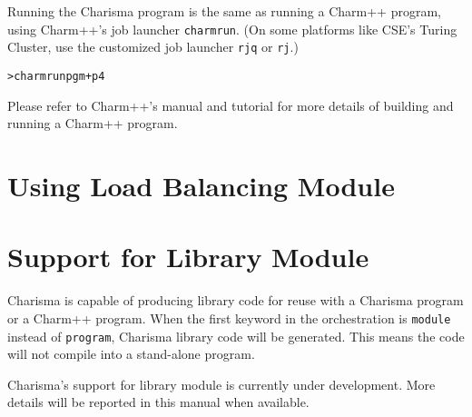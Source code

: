 \documentclass[10pt]{article}
\def\code#1{{\small {\tt {#1}}}}
\begin{document}
Running the Charisma program is the same as running a Charm++ program, using
Charm++'s job launcher \code{charmrun}. (On some platforms like CSE's Turing 
Cluster, use the customized job launcher \code{rjq} or \code{rj}.) 

\begin{alltt}
    > charmrun pgm +p4
\end{alltt}

Please refer to Charm++'s manual and tutorial for more details of building 
and running a Charm++ program. 

\section{Using Load Balancing Module}
\label{sec:ldb}


\section{Support for Library Module}
\label{sec:module}

Charisma is capable of producing library code for reuse with a Charisma program
or a Charm++ program. When the first keyword in the orchestration is
\code{module} instead of \code{program}, Charisma library code will be
generated. This means the code will not compile into a stand-alone program.

Charisma's support for library module is currently under development. More
details will be reported in this manual when available.

\appendix
\label{sec:appendix}

\end{document}
